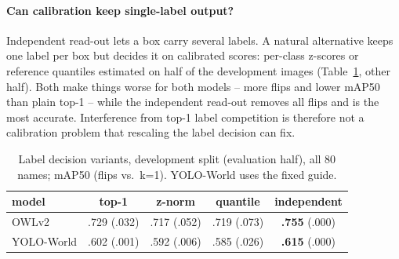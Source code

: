\documentclass[10pt,twocolumn,letterpaper]{article}
\begin{document}
\paragraph{Can calibration keep single-label output?} Independent read-out lets a box carry several labels. A natural
alternative keeps one label per box but decides it on calibrated scores: per-class z-scores or reference quantiles
estimated on half of the development images (Table~\ref{tab:norm}, other half). Both make things worse for both
models -- more flips and lower mAP50 than plain top-1 -- while the independent read-out removes all flips and is the
most accurate. Interference from top-1 label competition is therefore not a calibration problem that rescaling the label decision can fix.
\begin{table}[t]\centering\footnotesize\setlength{\tabcolsep}{3pt}
\caption{Label decision variants, development split (evaluation half), all 80 names; mAP50 (flips vs.\ k=1).
YOLO-World uses the fixed guide.}\label{tab:norm}
\begin{tabular}{lcccc}\toprule
model & top-1 & z-norm & quantile & independent\\\midrule
OWLv2 & .729 (.032) & .717 (.052) & .719 (.073) & \textbf{.755} (.000)\\
YOLO-World & .602 (.001) & .592 (.006) & .585 (.026) & \textbf{.615} (.000)\\\bottomrule
\end{tabular}\end{table}
\end{document}
